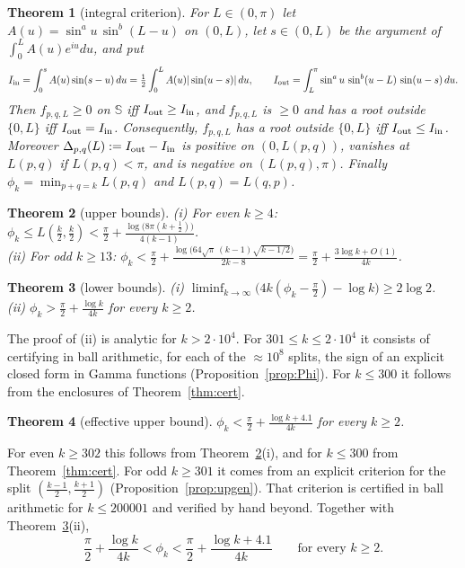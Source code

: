 \documentclass[11pt]{amsart}
\newtheorem{theorem}{Theorem}
\theoremstyle{definition}
\newcommand{\Sph}{\mathbb{S}}
\begin{document}
\begin{theorem}[integral criterion]\label{thm:crit}
For $L\in(0,\pi)$ let $A(u)=\sin^au\,\sin^b(L-u)$ on $(0,L)$, let $s\in(0,L)$ be the argument of $\int_0^LA(u)e^{iu}du$, and put
\[
I_{\rm in}=\int_0^sA(u)\sin(s-u)\,du=\tfrac12\int_0^LA(u)|\sin(u-s)|\,du,\qquad
I_{\rm out}=\int_L^\pi\sin^au\,\sin^b(u-L)\,\sin(u-s)\,du .
\]
Then $f_{p,q,L}\ge0$ on $\Sph$ iff $I_{\rm out}\ge I_{\rm in}$, and $f_{p,q,L}$ is $\ge0$ and has a root outside $\{0,L\}$ iff $I_{\rm out}=I_{\rm in}$.
Consequently, $f_{p,q,L}$ has a root outside $\{0,L\}$ iff $I_{\rm out}\le I_{\rm in}$.
Moreover $\Delta_{p,q}(L):=I_{\rm out}-I_{\rm in}$ is positive on $(0,L(p,q))$, vanishes at $L(p,q)$ if $L(p,q)<\pi$, and is negative on
$(L(p,q),\pi)$. Finally $\phi_k=\min_{p+q=k}L(p,q)$ and $L(p,q)=L(q,p)$.
\end{theorem}

\begin{theorem}[upper bounds]\label{thm:upper}
(i) For even $k\ge4$: $\displaystyle\phi_k\le L(\tfrac k2,\tfrac k2)<\frac\pi2+\frac{\log\big(8\pi(k+\tfrac12)\big)}{4(k-1)}$.\\
(ii) For odd $k\ge13$: $\displaystyle\phi_k<\frac\pi2+\frac{\log\big(64\sqrt\pi\,(k-1)\sqrt{k-1/2}\big)}{2k-8}=\frac\pi2+\frac{3\log k+O(1)}{4k}$.
\end{theorem}

\begin{theorem}[lower bounds]\label{thm:lower}
(i) $\liminf_{k\to\infty}\big(4k(\phi_k-\tfrac\pi2)-\log k\big)\ge2\log2$.\\
(ii) $\phi_k>\frac\pi2+\frac{\log k}{4k}$ for every $k\ge2$.
\end{theorem}

The proof of (ii) is analytic for $k>2\cdot10^4$. For $301\le k\le2\cdot10^4$ it consists of certifying in ball arithmetic, for each of the
$\approx10^8$ splits, the sign of an explicit closed form in Gamma functions (Proposition~\ref{prop:Phi}). For $k\le300$ it follows from the
enclosures of Theorem~\ref{thm:cert}.

\begin{theorem}[effective upper bound]\label{thm:oddsharp}
$\phi_k<\frac\pi2+\frac{\log k+4.1}{4k}$ for every $k\ge2$.
\end{theorem}
\noindent For even $k\ge302$ this follows from Theorem~\ref{thm:upper}(i), and for $k\le300$ from Theorem~\ref{thm:cert}. For odd $k\ge301$
it comes from an explicit criterion for the split $(\frac{k-1}2,\frac{k+1}2)$ (Proposition~\ref{prop:upgen}). That criterion is certified in ball
arithmetic for $k\le200001$ and verified by hand beyond. Together with Theorem~\ref{thm:lower}(ii),
\[
\frac\pi2+\frac{\log k}{4k}<\phi_k<\frac\pi2+\frac{\log k+4.1}{4k}\qquad\text{for every }k\ge2 .
\]
\end{document}
